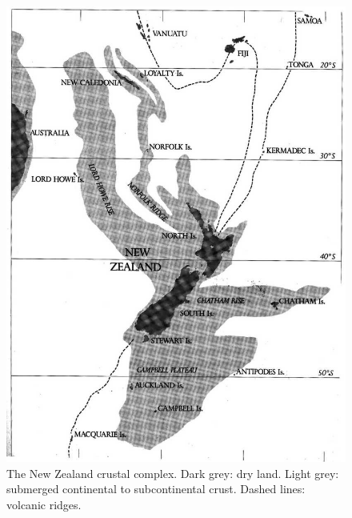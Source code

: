 \begin{figure}[htb]
	\centering
	\begin{minipage}[t]{0.5\textwidth}
		\centering
		\includegraphics[width=.9\textwidth]{graphics/figure2crust.jpg}
		\caption[The New Zealand crustal complex]{The New Zealand crustal complex.
		Dark grey: dry land.
		Light grey: submerged continental to subcontinental crust.
		Dashed lines: volcanic ridges.}%
		\label{fig:2crust}
	\end{minipage}\hfill%
	\begin{minipage}[t]{0.45\textwidth}
    	\centering

\end{minipage}
\end{figure}
